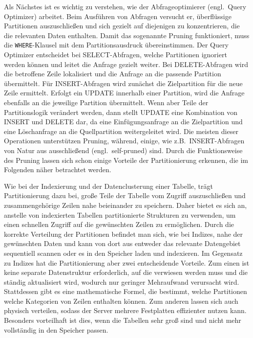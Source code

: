 Als Nächstes ist es wichtig zu verstehen, wie der Abfrageoptimierer (engl.\ Query Optimizer) arbeitet.
Beim Ausführen von Abfragen versucht er, überflüssige Partitionen auszuschließen und sich gezielt auf diejenigen zu konzentrieren, die die relevanten Daten enthalten.
Damit das sogenannte Pruning funktioniert, muss die \texttt{WHERE}-Klausel mit dem Partitionsausdruck übereinstimmen.
Der Query Optimizer entscheidet bei SELECT-Abfragen, welche Partitionen ignoriert werden können und leitet die Anfrage gezielt weiter.
Bei DELETE-Abfragen wird die betroffene Zeile lokalisiert und die Anfrage an die passende Partition übermittelt.
Für INSERT-Abfragen wird zunächst die Zielpartition für die neue Zeile ermittelt.
Erfolgt ein UPDATE innerhalb einer Partition, wird die Anfrage ebenfalls an die jeweilige Partition übermittelt.
Wenn aber Teile der Partitionslogik verändert werden, dann stellt UPDATE eine Kombination von INSERT und DELETE dar, da eine Einfügungsanfrage an die Zielpartition und eine Löschanfrage an die Quellpartition weitergeleitet wird.
Die meisten dieser Operationen unterstützen Pruning, während, einige, wie z.B.\ INSERT-Abfragen von Natur aus ausschließend (engl.\ self-pruned) sind.
Durch die Funktionsweise des Pruning lassen sich schon einige Vorteile der Partitionierung erkennen, die im Folgenden näher betrachtet werden.

Wie bei der Indexierung und der Datenclusterung einer Tabelle, trägt Partitionierung dazu bei, große Teile der Tabelle vom Zugriff auszuschließen und zusammengehörige Zeilen nahe beieinander zu speichern.
Daher bietet es sich an, anstelle von indexierten Tabellen partitionierte Strukturen zu verwenden, um einen schnellen Zugriff auf die gewünschten Zeilen zu ermöglichen.
Durch die korrekte Verteilung der Partitionen befindet man sich, wie bei Indizes, nahe der gewünschten Daten und kann von dort aus entweder das relevante Datengebiet sequentiell scannen oder es in den Speicher laden und indexieren.
Im Gegensatz zu Indizes hat die Partitionierung aber zwei entscheidende Vorteile.
Zum einen ist keine separate Datenstruktur erforderlich, auf die verwiesen werden muss und die ständig aktualisiert wird, wodurch nur geringer Mehraufwand verursacht wird.
Stattdessen gibt es eine mathematische Formel, die bestimmt, welche Partitionen welche Kategorien von Zeilen enthalten können.
Zum anderen lassen sich auch physisch verteilen, sodass der Server mehrere Festplatten effizienter nutzen kann.
Besonders vorteilhaft ist dies, wenn die Tabellen sehr groß sind und nicht mehr vollständig in den Speicher passen.

